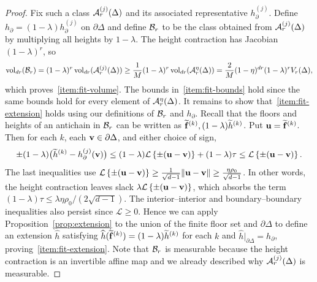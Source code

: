 \documentclass[11pt,letterpaper]{article}
\begin{document}
\begin{proof}
      Fix such a class $\mathcal A_{r}^{(j)}(\Delta)$ and its associated representative $h_\partial^{(j)}$. Define $h_\partial=(1-\lambda)h_\partial^{(j)}$ on $\partial\Delta$ and define $\mathcal B_r$ to be the class obtained from $\mathcal A_{r}^{(j)}(\Delta)$ by multiplying all heights by $1-\lambda$. The height contraction has Jacobian $(1-\lambda)^r$, so
      \[\operatorname{vol}_{dr}(\mathcal B_r)=(1-\lambda)^r\operatorname{vol}_{dr}(\mathcal A_{r}^{(j)}(\Delta))\geq \frac1M(1-\lambda)^r\operatorname{vol}_{dr}(\mathcal A_{r}^{\eta}(\Delta))=\frac2M(1-\eta)^{dr}(1-\lambda)^rV_r(\Delta),\]
      which proves~\ref{item:fit-volume}. The bounds in~\ref{item:fit-bounds} hold since the same bounds hold for every element of $\mathcal A_{r}^{\eta}(\Delta)$. It remains to show that~\ref{item:fit-extension} holds using our definitions of $\mathcal B_r$ and $h_\partial$. Recall that the floors and heights of an antichain in $\mathcal B_r$ can be written as $\widetilde{\mathbf f}^{(k)},(1-\lambda)\widetilde h^{(k)}$. Put $\mathbf u=\widetilde{\mathbf f}^{(k)}$. Then for each $k$, each $\mathbf v\in\partial\Delta$, and either choice of sign,
      \[
            \pm(1-\lambda)\bigl(\widetilde h^{(k)}-h_\partial^{(j)}(\mathbf v)\bigr) \le(1-\lambda)\mathcal L\left\{\pm(\mathbf u-\mathbf v)\right\}+(1-\lambda)\tau \le\mathcal L\left\{\pm(\mathbf u-\mathbf v)\right\}.
      \]
      The last inequalities use $\mathcal L\left\{\pm(\mathbf u-\mathbf v)\right\}\ge\frac{1}{\sqrt{d-1}}\|\mathbf u-\mathbf v\|\ge\frac{\eta\rho_0}{\sqrt{d-1}}$. In other words, the height contraction leaves slack $\lambda\mathcal L\left\{\pm(\mathbf u-\mathbf v)\right\}$, which absorbs the term $(1-\lambda)\tau\le\lambda\eta\rho_0/(2\sqrt{d-1})$. The interior--interior and boundary--boundary inequalities also persist since $\mathcal L\ge0$. Hence we can apply Proposition~\ref{prop:extension} to the union of the finite floor set and $\partial\Delta$ to define an extension $\widehat{h}$ satisfying $\widehat{h}(\widetilde{\mathbf f}^{(k)})=(1-\lambda)\widetilde h^{(k)}$ for each $k$ and $\widehat{h}|_{\partial\Delta}=h_{\partial}$, proving~\ref{item:fit-extension}. Note that $\mathcal B_r$ is measurable because the height contraction is an invertible affine map and we already described why $\mathcal A_{r}^{(j)}(\Delta)$ is measurable.%
\end{proof}
\end{document}
